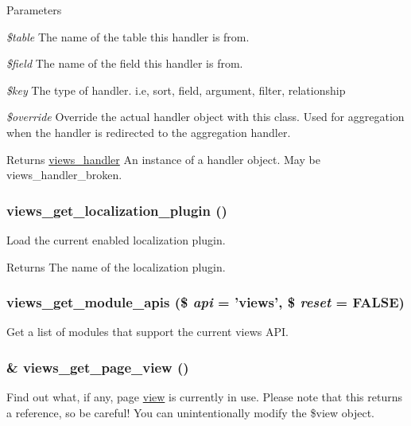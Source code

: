 \begin{DoxyParams}{Parameters}
\item[{\em \$table}]The name of the table this handler is from. \item[{\em \$field}]The name of the field this handler is from. \item[{\em \$key}]The type of handler. i.e, sort, field, argument, filter, relationship \item[{\em \$override}]Override the actual handler object with this class. Used for aggregation when the handler is redirected to the aggregation handler.\end{DoxyParams}
\begin{DoxyReturn}{Returns}
\hyperlink{classviews__handler}{views\_\-handler} An instance of a handler object. May be views\_\-handler\_\-broken. 
\end{DoxyReturn}
\hypertarget{views_8module_a21a516eefab3dad9e882299d604a3aee}{
\subsubsection[{views\_\-get\_\-localization\_\-plugin}]{\setlength{\rightskip}{0pt plus 5cm}views\_\-get\_\-localization\_\-plugin ()}}
\label{views_8module_a21a516eefab3dad9e882299d604a3aee}
Load the current enabled localization plugin.

\begin{DoxyReturn}{Returns}
The name of the localization plugin. 
\end{DoxyReturn}
\hypertarget{views_8module_a1da818e38d5362aa5474ed84c833cfc6}{
\subsubsection[{views\_\-get\_\-module\_\-apis}]{\setlength{\rightskip}{0pt plus 5cm}views\_\-get\_\-module\_\-apis (\$ {\em api} = {\ttfamily 'views'}, \/  \$ {\em reset} = {\ttfamily FALSE})}}
\label{views_8module_a1da818e38d5362aa5474ed84c833cfc6}
Get a list of modules that support the current views API. \hypertarget{views_8module_a6f9bd3baa42d847c9ea9dee1d0372db8}{
\subsubsection[{views\_\-get\_\-page\_\-view}]{\setlength{\rightskip}{0pt plus 5cm}\& views\_\-get\_\-page\_\-view ()}}
\label{views_8module_a6f9bd3baa42d847c9ea9dee1d0372db8}
Find out what, if any, page \hyperlink{classview}{view} is currently in use. Please note that this returns a reference, so be careful! You can unintentionally modify the \$view object.

